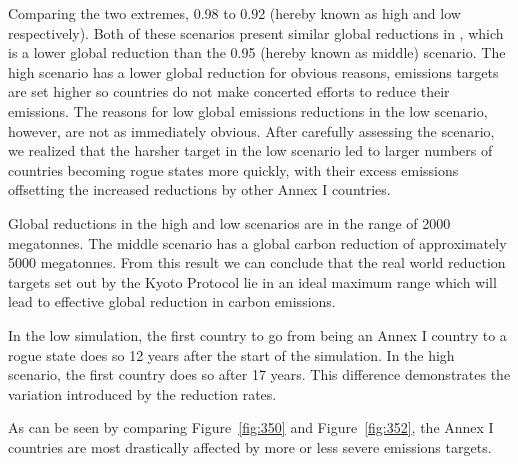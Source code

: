 Comparing the two extremes, 0.98 to 0.92 (hereby known as high and low respectively). Both of these scenarios present similar global reductions in \CO, which is a lower global reduction than the 0.95 (hereby known as middle) scenario. The high scenario has a lower global reduction for obvious reasons, emissions targets are set higher so countries do not make concerted efforts to reduce their \CO emissions. The reasons for low global emissions reductions in the low scenario, however, are not as immediately obvious. After carefully assessing the scenario, we realized that the harsher target in the low scenario led to larger numbers of countries becoming rogue states more quickly, with their excess emissions offsetting the increased reductions by other Annex I countries.

Global reductions in the high and low scenarios are in the range of 2000 megatonnes. The middle scenario has a global carbon reduction of approximately 5000 megatonnes. From this result we can conclude that the real world reduction targets set out by the Kyoto Protocol lie in an ideal maximum range which will lead to effective global reduction in carbon emissions.

In the low simulation, the first country to go from being an Annex I country to a rogue state does so 12 years after the start of the simulation. In the high scenario, the first country does so after 17 years. This difference demonstrates the variation introduced by the reduction rates.

As can be seen by comparing Figure~\ref{fig:350} and Figure~\ref{fig:352}, the Annex I countries are most drastically affected by more or less severe emissions targets.


